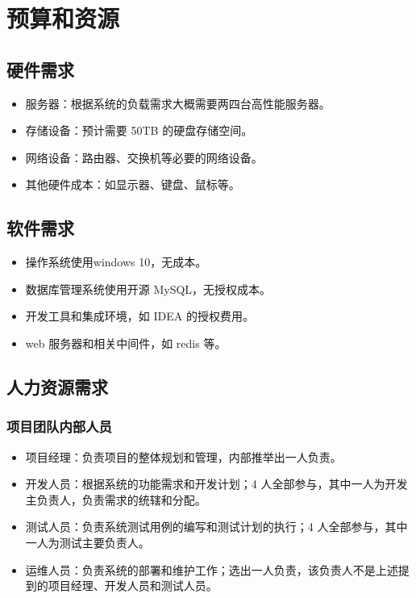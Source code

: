 \documentclass{article}
\begin{document}
\section{预算和资源}
\subsection{硬件需求}
\begin{itemize}
	\item 服务器：根据系统的负载需求大概需要两四台高性能服务器。
	\item 存储设备：预计需要 50TB 的硬盘存储空间。
	\item 网络设备：路由器、交换机等必要的网络设备。
	\item 其他硬件成本：如显示器、键盘、鼠标等。
\end{itemize}

\subsection{软件需求}
\begin{itemize}
	\item 操作系统使用windows 10，无成本。
	\item 数据库管理系统使用开源 MySQL，无授权成本。
	\item 开发工具和集成环境，如 IDEA 的授权费用。
	\item web 服务器和相关中间件，如 redis 等。
\end{itemize}

\subsection{人力资源需求}
\subsubsection{项目团队内部人员}
\begin{itemize}
	\item 项目经理：负责项目的整体规划和管理，内部推举出一人负责。
	\item 开发人员：根据系统的功能需求和开发计划；4 人全部参与，其中一人为开发主负责人，负责需求的统辖和分配。
	\item 测试人员：负责系统测试用例的编写和测试计划的执行；4 人全部参与，其中一人为测试主要负责人。
	\item 运维人员：负责系统的部署和维护工作；选出一人负责，该负责人不是上述提到的项目经理、开发人员和测试人员。
\end{itemize}
\end{document}

